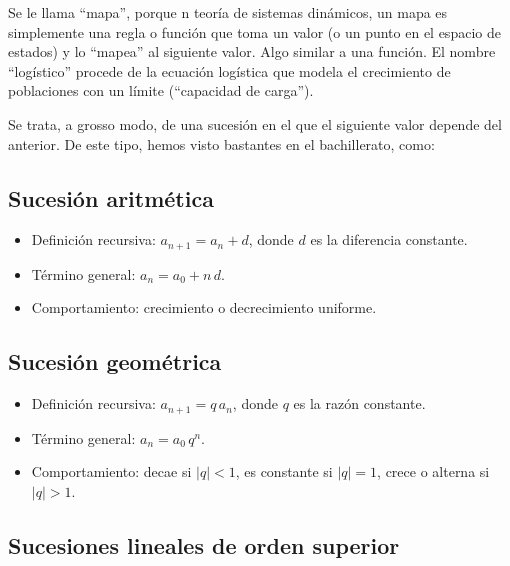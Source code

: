 \documentclass[
  11pt,
  a4paper,
  DIV=11,
  numbers=noendperiod]{scrreprt}
\providecommand{\tightlist}{%
  \setlength{\itemsep}{0pt}\setlength{\parskip}{0pt}}
\begin{document}
Se le llama ``mapa'', porque n teoría de sistemas dinámicos, un mapa es
simplemente una regla o función que toma un valor (o un punto en el
espacio de estados) y lo ``mapea'' al siguiente valor. Algo similar a
una función. El nombre ``logístico'' procede de la ecuación logística
que modela el crecimiento de poblaciones con un límite (``capacidad de
carga'').

Se trata, a grosso modo, de una sucesión en el que el siguiente valor
depende del anterior. De este tipo, hemos visto bastantes en el
bachillerato, como:

\subsection{Sucesión aritmética}\label{sucesiuxf3n-aritmuxe9tica}

\begin{itemize}
\tightlist
\item
  Definición recursiva: \(a_{n+1} = a_n + d\), donde \(d\) es la
  diferencia constante.\\
\item
  Término general: \(a_n = a_0 + n\,d\).\\
\item
  Comportamiento: crecimiento o decrecimiento uniforme.
\end{itemize}

\subsection{Sucesión geométrica}\label{sucesiuxf3n-geomuxe9trica}

\begin{itemize}
\tightlist
\item
  Definición recursiva: \(a_{n+1} = q\,a_n\), donde \(q\) es la razón
  constante.\\
\item
  Término general: \(a_n = a_0\,q^n\).\\
\item
  Comportamiento: decae si \(|q|<1\), es constante si \(|q|=1\), crece o
  alterna si \(|q|>1\).
\end{itemize}

\subsection{Sucesiones lineales de orden
superior}\label{sucesiones-lineales-de-orden-superior}
\end{document}
